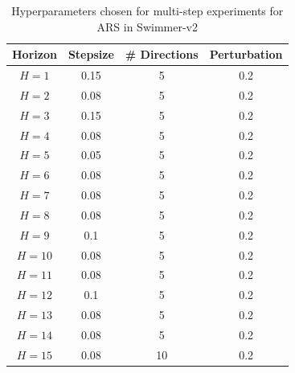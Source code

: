\begin{table}[ht]
    \centering
    \begin{tabular}{|c|c|c|c|}
    \hline
      \textbf{Horizon} & \textbf{Stepsize} &
                                             \textbf{\#
                                             Directions} &
                                                           \textbf{Perturbation}\\
      \hline
      $H = 1$ & 0.15  & 5  & 0.2 \\
      \hline
      $H = 2$ & 0.08  & 5 &  0.2\\
      \hline
      $H = 3$ & 0.15  & 5 &  0.2\\
      \hline
      $H = 4$ & 0.08  & 5 & 0.2 \\
      \hline
      $H = 5$ & 0.05  & 5 &  0.2\\
      \hline
      $H = 6$ & 0.08  &5  & 0.2 \\
      \hline
      $H = 7$ & 0.08  & 5 & 0.2 \\
      \hline
      $H = 8$ & 0.08  & 5 & 0.2 \\
      \hline
      $H = 9$ & 0.1  &5  & 0.2 \\
      \hline
      $H = 10$ & 0.08  &5  & 0.2 \\
      \hline
      $H = 11$ & 0.08  &5  & 0.2 \\
      \hline
      $H = 12$ & 0.1  &5  & 0.2 \\
      \hline
      $H = 13$ & 0.08  & 5 & 0.2 \\
      \hline
      $H = 14$ & 0.08  & 5 &0.2  \\
      \hline
      $H = 15$ & 0.08  & 10 & 0.2 \\
      \hline
    \end{tabular}
    \caption{Hyperparameters chosen for multi-step experiments for ARS
    in Swimmer-v2}
    \label{tab:chosen-hyperparam-multi-ars-swimmer}
\end{table}


